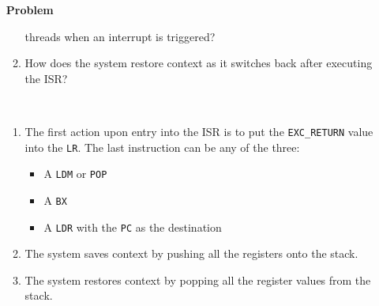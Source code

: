 \documentclass[12pt]{article}
\newenvironment{Ex}{\textbf{Problem}\vspace{.75em}\\}{}
\begin{document}
\begin{enumerate}
\begin{Ex}
\begin{enumerate}
      threads when an interrupt is triggered?
    \item How does the system restore context as it switches back
      after executing the ISR?
    \end{enumerate}
    \begin{solution} \hfill \vspace{.75em} \\
      \begin{enumerate}
      \item The first action upon entry into the ISR is to put the
        \verb|EXC_RETURN| value into the \verb|LR|. The last
        instruction can be any of the three:
        \begin{itemize}
        \item A \verb|LDM| or \verb|POP|
        \item A \verb|BX|
        \item A \verb|LDR| with the \verb|PC| as the destination
        \end{itemize}
      \item The system saves context by pushing all the registers onto
        the stack.
      \item The system restores context by popping all the register
        values from the stack.
      \end{enumerate}
    \end{solution}
  \end{Ex}
\end{enumerate}
\end{document}
